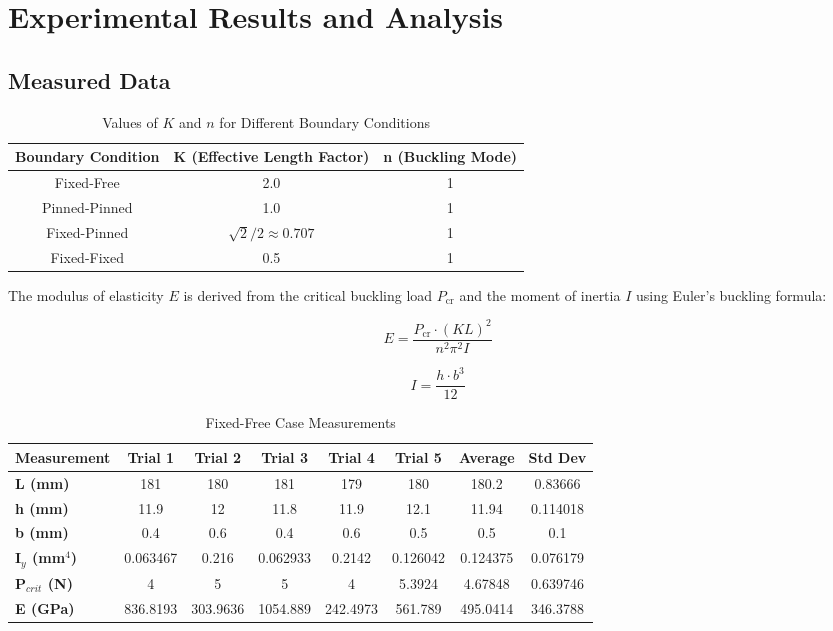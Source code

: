 \documentclass[12pt]{article}
\begin{document}
\section{Experimental Results and Analysis}
\label{sec:results}

\subsection{Measured Data}
\label{subsec:data}

\begin{table}[h!]
\centering
\caption{Values of \( K \) and \( n \) for Different Boundary Conditions}
\begin{tabular}{|c|c|c|}
\hline
\textbf{Boundary Condition} & \textbf{K (Effective Length Factor)} & \textbf{n (Buckling Mode)} \\ \hline
Fixed-Free    & 2.0  & 1 \\ \hline
Pinned-Pinned & 1.0  & 1 \\ \hline
Fixed-Pinned  & \(\sqrt{2}/2 \approx 0.707\)  & 1 \\ \hline
Fixed-Fixed   & 0.5  & 1 \\ \hline
\end{tabular}
\label{tab:K_n_values}
\end{table}

The modulus of elasticity \( E \) is derived from the critical buckling load \( P_{\text{cr}} \) and the moment of inertia \( I \) using Euler’s buckling formula:

\[
E = \frac{P_{\text{cr}} \cdot (K L)^2}{n^2 \pi^2 I}
\]

\[
I = \frac{h \cdot b^3}{12}
\]

\begin{table}[h!]
\centering
\caption{Fixed-Free Case Measurements}
\begin{tabular}{@{}lccccccc@{}}
\toprule
\textbf{Measurement} & \textbf{Trial 1} & \textbf{Trial 2} & \textbf{Trial 3} & \textbf{Trial 4} & \textbf{Trial 5} & \textbf{Average} & \textbf{Std Dev} \\ \midrule
\textbf{L (mm)} & 181 & 180 & 181 & 179 & 180 & 180.2 & 0.83666 \\
\textbf{h (mm)} & 11.9 & 12 & 11.8 & 11.9 & 12.1 & 11.94 & 0.114018 \\
\textbf{b (mm)} & 0.4 & 0.6 & 0.4 & 0.6 & 0.5 & 0.5 & 0.1 \\
\textbf{I\(_y\) (mm\(^4\))} & 0.063467 & 0.216 & 0.062933 & 0.2142 & 0.126042 & 0.124375 & 0.076179 \\
\textbf{P\(_{crit}\) (N)} & 4 & 5 & 5 & 4 & 5.3924 & 4.67848 & 0.639746 \\
\textbf{E (GPa)} & 836.8193 & 303.9636 & 1054.889 & 242.4973 & 561.789 & 495.0414 & 346.3788 \\
\bottomrule
\end{tabular}
\label{tab:fixed_free}
\end{table}
\end{document}
